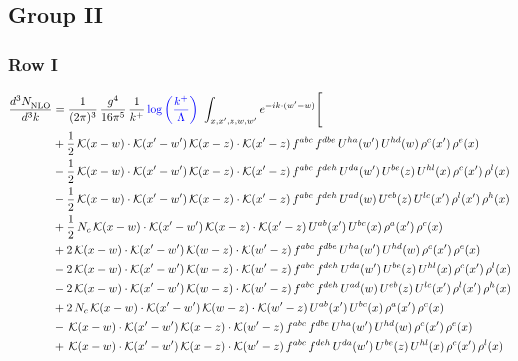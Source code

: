 \documentclass[9pt]{article}
\numberwithin{equation}{section}
\begin{document}
\subsection{Group II}
\subsubsection{Row I}
\begin{align}
 \frac{d^{3}N_{\rm NLO}^{\rm}}{d^{3}k}  & = \frac{1}{(2\pi)^{3}}\,\frac{g^{4}}{16\pi^{5}}\,\frac{1}{k^{+}}\,{\color{blue}\log{\left(\frac{k^{+}}{\Lambda}\right)}}\,\,\int_{x,x',z,w,w'}e^{-ik\cdot(w'-w)}\Bigg[\notag\\
&+\frac{1}{2}\,\mathcal{K}(x-w)\cdot\mathcal{K}(x'-w')\,\mathcal{K}(x-z)\cdot\mathcal{K}(x'-z)\,f^{abc}\,f^{dbe}\,U^{ha}(w')\,U^{hd}(w)\,\rho^{c}(x')\,\rho^{e}(x)\notag\\
&-\frac{1}{2}\,\mathcal{K}(x-w)\cdot\mathcal{K}(x'-w')\,\mathcal{K}(x-z)\cdot\mathcal{K}(x'-z)\,f^{abc}\,f^{deh}\,U^{da}(w')\,U^{be}(z)\,U^{hl}(x)\,\rho^{c}(x')\,\rho^{l}(x)\notag\\
&-\frac{1}{2}\,\mathcal{K}(x-w)\cdot\mathcal{K}(x'-w')\,\mathcal{K}(x-z)\cdot\mathcal{K}(x'-z)\,f^{abc}\,f^{deh}\,U^{ad}(w)\,U^{eb}(z)\,U^{lc}(x')\,\rho^{l}(x')\,\rho^{h}(x)\notag\\
&+\frac{1}{2}\,N_{c}\,\mathcal{K}(x-w)\cdot\mathcal{K}(x'-w')\,\mathcal{K}(x-z)\cdot\mathcal{K}(x'-z)\,U^{ab}(x')\,U^{bc}(x)\,\rho^{a}(x')\,\rho^{c}(x)\notag\\
&+2\,\mathcal{K}(x-w)\cdot\mathcal{K}(x'-w')\,\mathcal{K}(w-z)\cdot\mathcal{K}(w'-z)\,f^{abc}\,f^{dbe}\,U^{ha}(w')\,U^{hd}(w)\,\rho^{c}(x')\,\rho^{e}(x)\notag\\
&-2\,\mathcal{K}(x-w)\cdot\mathcal{K}(x'-w')\,\mathcal{K}(w-z)\cdot\mathcal{K}(w'-z)\,f^{abc}\,f^{deh}\,U^{da}(w')\,U^{be}(z)\,U^{hl}(x)\,\rho^{c}(x')\,\rho^{l}(x)\notag\\
&-2\,\mathcal{K}(x-w)\cdot\mathcal{K}(x'-w')\,\mathcal{K}(w-z)\cdot\mathcal{K}(w'-z)\,f^{abc}\,f^{deh}\,U^{ad}(w)\,U^{eb}(z)\,U^{lc}(x')\,\rho^{l}(x')\,\rho^{h}(x)\notag\\
&+2\,N_{c}\,\mathcal{K}(x-w)\cdot\mathcal{K}(x'-w')\,\mathcal{K}(w-z)\cdot\mathcal{K}(w'-z)\,U^{ab}(x')\,U^{bc}(x)\,\rho^{a}(x')\,\rho^{c}(x)\notag\\
&-\,\mathcal{K}(x-w)\cdot\mathcal{K}(x'-w')\,\mathcal{K}(x-z)\cdot\mathcal{K}(w'-z)\,f^{abc}\,f^{dbe}\,U^{ha}(w')\,U^{hd}(w)\,\rho^{c}(x')\,\rho^{e}(x)\notag\\
&+\,\mathcal{K}(x-w)\cdot\mathcal{K}(x'-w')\,\mathcal{K}(x-z)\cdot\mathcal{K}(w'-z)\,f^{abc}\,f^{deh}\,U^{da}(w')\,U^{be}(z)\,U^{hl}(x)\,\rho^{c}(x')\,\rho^{l}(x)\notag\\

\end{align}
\end{document}
